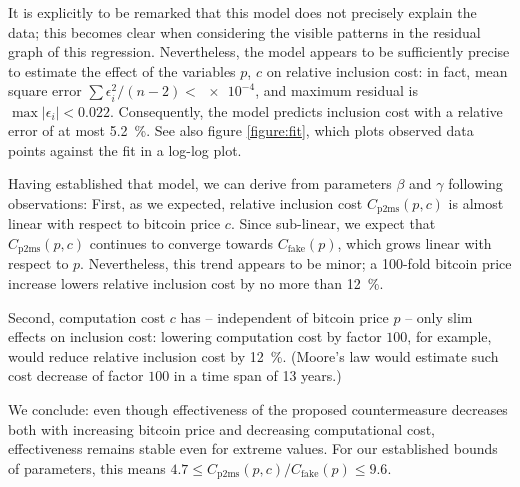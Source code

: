 \documentclass[a4paper,11pt,titlepage]{scrbook}
\begin{document}
It is explicitly to be remarked that this model does not precisely explain the data; this becomes clear when considering the visible patterns in the residual graph of this regression.
Nevertheless, the model appears to be sufficiently precise to estimate the effect of the variables $p$, $c$ on relative inclusion cost: in fact, mean square error $\sum \epsilon_i^2/(n-2) < \num{e-4}$, and maximum residual is $\max |\epsilon_i| < 0.022$. Consequently, the model predicts inclusion cost with a relative error of at most \SI{5.2}{\percent}.
See also figure \ref{figure:fit}, which plots observed data points against the fit in a log-log plot.

Having established that model, we can derive from parameters $\beta$ and $\gamma$ following observations:
First, as we expected, relative inclusion cost $C_\mathrm{p2ms}(p,c)$ is almost linear with respect to bitcoin price $c$.
Since sub-linear, we expect that $C_\mathrm{p2ms}(p,c)$ continues to converge towards $C_\mathrm{fake}(p)$, which grows linear with respect to $p$.
Nevertheless, this trend appears to be minor; a 100-fold bitcoin price increase lowers relative inclusion cost by no more than \SI{12}{\percent}.

Second, computation cost $c$ has – independent of bitcoin price $p$ – only slim effects on inclusion cost: lowering computation cost by factor $100$, for example, would reduce relative inclusion cost by \SI{12}{\percent}. (Moore's law would estimate such cost decrease of factor $100$ in a time span of 13 years.)

We conclude: even though effectiveness of the proposed countermeasure decreases both with increasing bitcoin price and decreasing computational cost, effectiveness remains stable even for extreme values.
For our established bounds of parameters, this means $\num{4.7} \leq C_\mathrm{p2ms}(p,c) / C_\mathrm{fake}(p) \leq \num{9.6}$.
\end{document}
